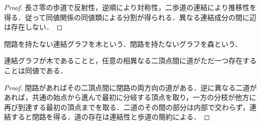 \begin{proof}
長さ零の歩道で反射性，逆順により対称性，二歩道の連結により推移性を得る．従って同値関係の同値類による分割が得られる．異なる連結成分の間に辺は存在しない．
\end{proof}
\begin{defn}[木]
閉路を持たない連結グラフを木という．閉路を持たないグラフを森という．
\end{defn}
\begin{prop}[木における道の一意性]
連結グラフが木であることと，任意の相異なる二頂点間に道がただ一つ存在することは同値である．
\end{prop}
\begin{proof}
閉路があればその二頂点間に閉路の両方向の道がある．逆に異なる二道があれば，共通の始点から進んで最初に分岐する頂点を取り，一方の分枝が他方に再び到達する最初の頂点までを取る．二道のその間の部分は内部で交わらず，連結すると閉路を得る．道の存在は連結性と歩道の簡約による．
\end{proof}
